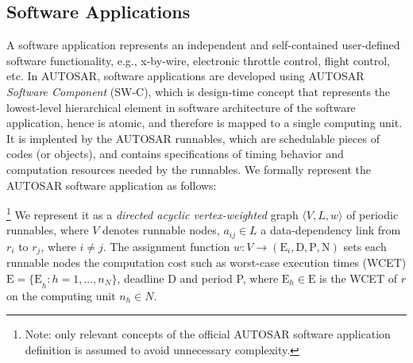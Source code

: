 \subsection{Software Applications}
A software application represents an independent and self-contained user-defined software functionality, e.g., x-by-wire, electronic throttle control, flight control, etc. In AUTOSAR, software applications are developed using AUTOSAR \textit{Software Component} (SW-C), which is design-time concept that represents the lowest-level hierarchical element in software architecture of the software application, hence is atomic, and therefore is mapped to a single computing unit. It is implented by the AUTOSAR runnables, which are schedulable pieces of codes (or objects), and contains specifications of timing behavior and computation resources needed by the runnables. We formally represent the AUTOSAR software application as follows:
\begin{definition}\footnote{ Note: only relevant concepts of the official AUTOSAR software application definition is assumed to avoid unnecessary complexity. }\label{def_application}
	We represent it as a \textit{directed acyclic vertex-weighted} graph $\langle V, L, w\rangle$ of periodic runnables, where $V$ denotes runnable nodes, $a_{ij}\in L$ a data-dependency link from $r_i$ to $r_j$, where $i \neq j$. The assignment function $w: V\rightarrow (\mathrm{E}_i\mathrm{,D,P, N})$ sets each runnable nodes the computation cost such as worst-case execution times (WCET) $\mathrm{E=\{E}_h:h=1,...,n_N\}$, deadline D and period P, where $\mathrm{E}_h\in \mathrm{E}$ is the WCET of $r$ on the computing unit $n_h\in N$.
\end{definition}
